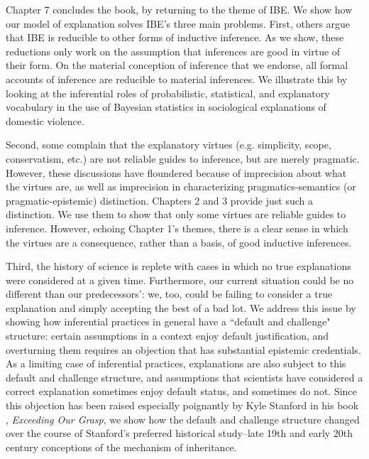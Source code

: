 \documentclass{article}[11pt]
\begin{document}
Chapter 7 concludes the book, by returning to the theme of IBE. We show how our model of explanation solves IBE's three main problems. First, others argue that IBE is reducible to other forms of inductive inference. As we show, these reductions only work on the assumption that inferences are good in virtue of their form. On the material conception of inference that we endorse, all formal accounts of inference are reducible to material inferences. We illustrate this by looking at the inferential roles of probabilistic, statistical, and explanatory vocabulary in the use of Bayesian statistics in sociological explanations of domestic violence.

Second, some complain that the explanatory virtues (e.g. simplicity, scope, conservatism, etc.) are not reliable guides to inference, but are merely pragmatic. However, these discussions have floundered because of imprecision about what the virtues are, as well as imprecision in characterizing pragmatics-semantics (or pragmatic-epistemic) distinction. Chapters 2 and 3 provide just such a distinction. We use them to show that only some virtues are reliable guides to inference. However, echoing Chapter 1's themes, there is a clear sense in which the virtues are a consequence, rather than a basis, of good inductive inferences.

Third, the history of science is replete with cases in which no true explanations were considered at a given time. Furthermore, our current situation could be no different than our predecessors’: we, too, could be failing to consider a true explanation and simply accepting the best of a bad lot. We address this issue by showing how inferential practices in general have a ``default and challenge" structure: certain assumptions in a context enjoy default justification, and overturning them requires an objection that has substantial epistemic credentials. As a limiting case of inferential practices, explanations are also subject to this default and challenge structure, and assumptions that scientists have considered a correct explanation sometimes enjoy default status, and sometimes do not. Since this objection has been raised especially poignantly by Kyle Stanford in his book , \textit{Exceeding Our Grasp}, we show how the default and challenge structure changed over the course of Stanford's preferred historical study--late 19th and early 20th century conceptions of the mechanism of inheritance.


\end{document}
